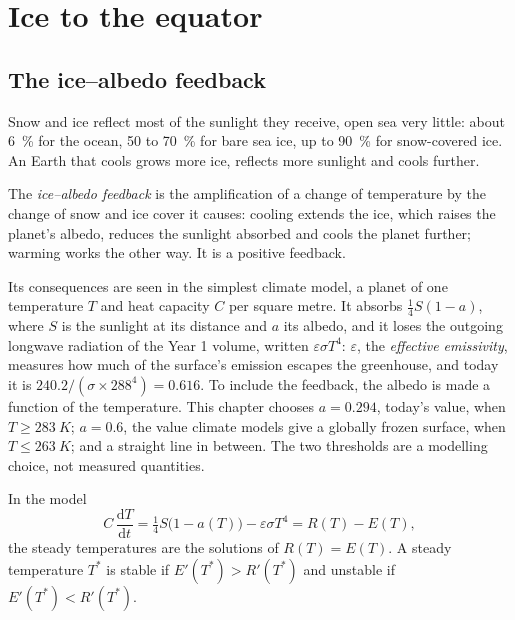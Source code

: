 \section{Ice to the equator}\label{sec:b2:precambrian-earth:snowball}

\subsection*{The ice--albedo feedback}

Snow and ice reflect most of the sunlight they receive, open sea very little: about
\qty{6}{\percent} for the ocean, 50 to \qty{70}{\percent} for bare sea ice, up to
\qty{90}{\percent} for snow-covered ice. An Earth that cools grows more ice, reflects more
sunlight and cools further.

\begin{definition}\label{def:b2:precambrian-earth:ice-albedo}
The \emph{ice--albedo feedback} is the amplification of a change
of temperature by the change of snow and ice cover it causes: cooling extends the ice, which
raises the planet's albedo, reduces the sunlight absorbed and cools the planet further;
warming works the other way. It is a positive feedback.
\end{definition}

Its consequences are seen in the simplest climate model, a planet of one temperature $T$ and
heat capacity $C$ per square metre. It absorbs $\tfrac14 S(1 - a)$, where $S$ is the sunlight
at its distance and $a$ its albedo, and it loses the outgoing longwave radiation of the Year 1
volume, written $\varepsilon\sigma T^4$: $\varepsilon$, the \emph{effective emissivity},
measures how much of the surface's emission escapes the greenhouse, and today it is
$240.2/(\sigma\times288^4) = 0.616$. To include the feedback, the albedo is made a function of
the temperature. This chapter chooses $a = 0.294$, today's value, when $T \ge \qty{283}{K}$; $a
= 0.6$, the value climate models give a globally frozen surface, when $T \le \qty{263}{K}$; and
a straight line in between. The two thresholds are a modelling choice, not measured
quantities.

\begin{proposition}\label{prop:b2:precambrian-earth:ebm}
In the model
\[
  C\,\frac{\mathrm dT}{\mathrm dt} = \tfrac14 S\bigl(1 - a(T)\bigr) - \varepsilon\sigma T^4
  = R(T) - E(T),
\]
the steady temperatures are the solutions of $R(T) = E(T)$. A steady temperature $T^*$ is
stable if $E'(T^*) > R'(T^*)$ and unstable if $E'(T^*) < R'(T^*)$.
\end{proposition}

